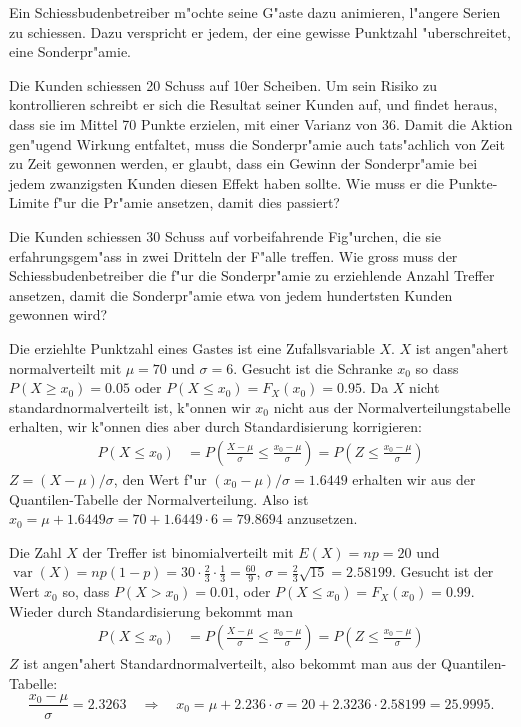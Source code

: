 Ein Schiessbudenbetreiber m"ochte seine G"aste dazu animieren,
l"angere Serien zu schiessen. Dazu verspricht er jedem, der eine
gewisse Punktzahl "uberschreitet, eine Sonderpr"amie.
\begin{teilaufgaben}
\item
Die Kunden schiessen 20 Schuss auf 10er Scheiben. Um sein Risiko
zu kontrollieren schreibt er sich die Resultat seiner Kunden auf,
und findet heraus, dass sie im Mittel 70 Punkte erzielen, mit einer
Varianz von 36. Damit die Aktion gen"ugend Wirkung entfaltet,
muss die Sonderpr"amie auch tats"achlich von Zeit zu Zeit
gewonnen werden, er glaubt, dass ein Gewinn der Sonderpr"amie
bei jedem zwanzigsten Kunden diesen Effekt haben sollte. Wie
muss er die Punkte-Limite f"ur die Pr"amie ansetzen, damit dies
passiert?
\item
Die Kunden schiessen 30 Schuss auf vorbeifahrende Fig"urchen, die
sie erfahrungsgem"ass in zwei Dritteln der F"alle treffen. Wie
gross muss der Schiessbudenbetreiber die f"ur die Sonderpr"amie
zu erziehlende Anzahl Treffer ansetzen, damit die Sonderpr"amie
etwa von jedem hundertsten Kunden gewonnen wird?
\end{teilaufgaben}

\begin{loesung}
\begin{teilaufgaben}
\item
Die erziehlte Punktzahl eines Gastes ist eine Zufallsvariable $X$.
$X$ ist angen"ahert normalverteilt mit $\mu=70$ und
$\sigma=6$. Gesucht ist die Schranke $x_0$ so dass
$P(X\ge x_0)=0.05$ oder $P(X\le x_0)=F_X(x_0)=0.95$.
Da $X$ nicht standardnormalverteilt ist, k"onnen wir $x_0$ nicht
aus der Normalverteilungstabelle erhalten, wir k"onnen dies aber
durch Standardisierung korrigieren:
\begin{align*}
P(X\le x_0)
&=
P\left(\frac{X-\mu}{\sigma}\le\frac{x_0-\mu}{\sigma}\right)
=
P\left(Z\le \frac{x_0-\mu}{\sigma}\right)
\end{align*}
$Z=(X-\mu)/\sigma$, den Wert f"ur $(x_0-\mu)/\sigma=1.6449$ erhalten
wir aus der Quantilen-Tabelle der Normalverteilung. Also ist
$x_0=\mu +1.6449\sigma=70 + 1.6449\cdot 6=79.8694$ anzusetzen.
\item
Die Zahl $X$ der Treffer ist binomialverteilt mit $E(X) = np=20$ und
$\operatorname{var}(X)=np(1-p)=30\cdot\frac23\cdot\frac13=\frac{60}{9}$,
$\sigma = \frac23\sqrt{15}=2.58199$.
Gesucht ist der Wert $x_0$ so, dass $P(X>x_0)=0.01$, oder
$P(X\le x_0)=F_X(x_0)=0.99$. Wieder durch Standardisierung bekommt
man
\begin{align*}
P(X\le x_0)
&=
P\left(
\frac{X-\mu}{\sigma}\le\frac{x_0-\mu}{\sigma}
\right)
=
P\left(
Z\le \frac{x_0-\mu}{\sigma}
\right)
\end{align*}
$Z$ ist angen"ahert Standardnormalverteilt, also bekommt man aus
der Quantilen-Tabelle:
\[
\frac{x_0-\mu}{\sigma}=2.3263
\quad
\Rightarrow
\quad
x_0=\mu+2.236\cdot \sigma=20 + 2.3236\cdot 2.58199 = 25.9995.
\]
\end{teilaufgaben}
\end{loesung}

